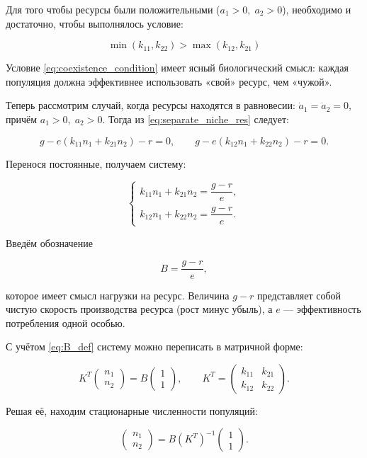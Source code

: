 \documentclass[a4paper, 14pt]{extarticle}
\begin{document}
Для того чтобы ресурсы были положительными ($a_1 > 0,\; a_2 > 0$), необходимо
и достаточно, чтобы выполнялось условие:

\begin{equation}
\min(k_{11}, k_{22}) > \max(k_{12}, k_{21})
\label{eq:coexistence_condition}
\end{equation}

Условие \eqref{eq:coexistence_condition} имеет ясный биологический смысл: 
каждая популяция должна эффективнее использовать «свой» ресурс, чем «чужой».

Теперь рассмотрим случай, когда ресурсы находятся в равновесии: 
$\dot a_1 = \dot a_2 = 0$, причём $a_1 > 0,\; a_2 > 0$.
Тогда из \eqref{eq:separate_niche_res} следует:

\[
g - e(k_{11}n_1 + k_{21}n_2) - r = 0, \qquad
g - e(k_{12}n_1 + k_{22}n_2) - r = 0.
\]

Перенося постоянные, получаем систему:

\[
\begin{cases}
k_{11}n_1 + k_{21}n_2 = \dfrac{g-r}{e}, \\[6pt]
k_{12}n_1 + k_{22}n_2 = \dfrac{g-r}{e}.
\end{cases}
\]

Введём обозначение 

\begin{equation}
B = \frac{g-r}{e},
\label{eq:B_def}
\end{equation}

которое имеет смысл нагрузки на ресурс. Величина $g-r$ представляет собой чистую скорость производства ресурса (рост минус убыль), а $e$ — эффективность потребления одной особью.

С учётом \eqref{eq:B_def} систему можно переписать в матричной форме:

\[
K^{\!T} \begin{pmatrix} n_1 \\ n_2 \end{pmatrix} = B \begin{pmatrix} 1 \\ 1 \end{pmatrix},
\qquad 
K^{\!T} = \begin{pmatrix} k_{11} & k_{21} \\ k_{12} & k_{22} \end{pmatrix}.
\]

Решая её, находим стационарные численности популяций:

\[
\begin{pmatrix} n_1 \\ n_2 \end{pmatrix} = B (K^T)^{-1} \begin{pmatrix} 1 \\ 1 \end{pmatrix}.
\]
\end{document}
